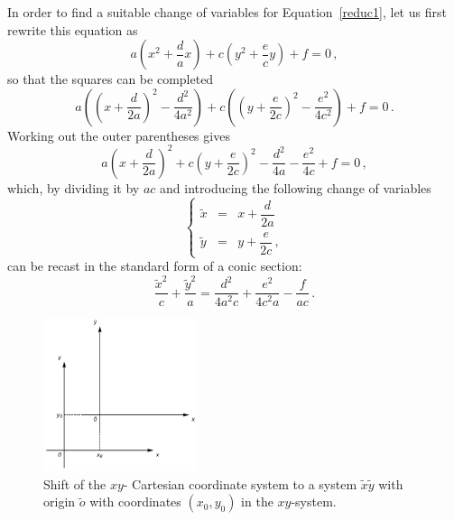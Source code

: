 In order to find a suitable change of variables for Equation~\eqref{reduc1}, let us first rewrite this equation as
$$
a\left(x^2+\dfrac{d}{a}x\right)+c\left(y^2+\dfrac{e}{c}y\right)+f=0\,,
$$
so that the squares can be completed
$$
a\left(\left(x+\dfrac{d}{2a}\right)^2-\dfrac{d^2}{4a^2}\right)+c\left(\left(y+\dfrac{e}{2c}\right)^2-\dfrac{e^2}{4c^2}\right)+f=0\,.
$$
Working out the outer parentheses gives
$$
a\left(x+\dfrac{d}{2a}\right)^2+c\left(y+\dfrac{e}{2c}\right)^2-\dfrac{d^2}{4a}-\dfrac{e^2}{4c}+f=0\,, 
$$
which, by dividing it by $ac$ and introducing the following change of variables 
$$
\left\{\begin{array}{rcl}
\widetilde{x} & = & x+\dfrac{d}{2a}\\[.2cm]
\widetilde{y} & = & y+\dfrac{e}{2c}\,, 
\end{array}\right. 
$$
can be recast in the standard form of a conic section:
\begin{equation}
\dfrac{\widetilde{x}^2}{c}+\dfrac{\widetilde{y}^2}{a}=\dfrac{d^2}{4a^2c}+\dfrac{e^2}{4c^2a}-\dfrac{f}{ac}\,. 
\label{standardconic}
\end{equation}

\begin{figure}[h]
	\begin{center}
			\includegraphics[width=0.4\textwidth]{fig_trans_43}
	\caption{Shift of the $xy$- Cartesian coordinate system to a system $\widetilde{x}\widetilde{y}$ with origin $\widetilde{o}$ with coordinates $(x_0,y_0)$ in the $xy$-system.}
	\label{fig_trans_43}
	\end{center}
\end{figure} 


